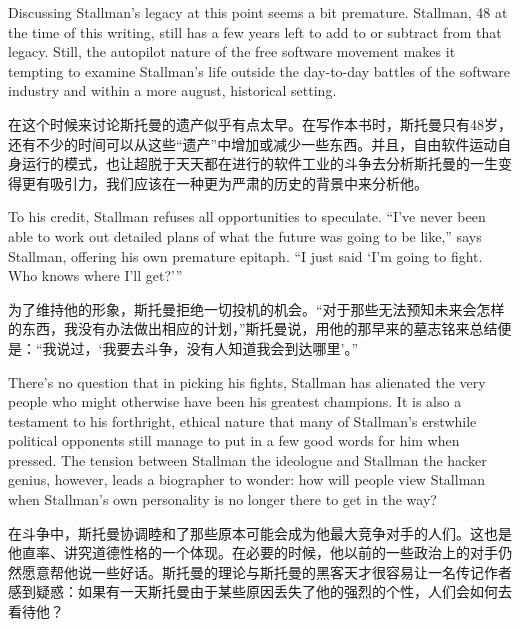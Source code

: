 \ifdefined\eng
Discussing Stallman's legacy at this point seems a bit premature. Stallman, 48 at the time of this writing, still has a few years left to add to or subtract from that legacy. Still, the autopilot nature of the free software movement makes it tempting to examine Stallman's life outside the day-to-day battles of the software industry and within a more august, historical setting.
\fi

\ifdefined\chs
在这个时候来讨论斯托曼的遗产似乎有点太早。在写作本书时，斯托曼只有48岁，还有不少的时间可以从这些``遗产''中增加或减少一些东西。并且，自由软件运动自身运行的模式，也让超脱于天天都在进行的软件工业的斗争去分析斯托曼的一生变得更有吸引力，我们应该在一种更为严肃的历史的背景中来分析他。
\fi

\ifdefined\eng
To his credit, Stallman refuses all opportunities to speculate. ``I've never been able to work out detailed plans of what the future was going to be like,'' says Stallman, offering his own premature epitaph. ``I just said `I'm going to fight. Who knows where I'll get?'\hspace{0.01in}''
\fi

\ifdefined\chs
为了维持他的形象，斯托曼拒绝一切投机的机会。``对于那些无法预知未来会怎样的东西，我没有办法做出相应的计划，''斯托曼说，用他的那早来的墓志铭来总结便是：``我说过，`我要去斗争，没有人知道我会到达哪里'。''
\fi

\ifdefined\eng
There's no question that in picking his fights, Stallman has alienated the very people who might otherwise have been his greatest champions. It is also a testament to his forthright, ethical nature that many of Stallman's erstwhile political opponents still manage to put in a few good words for him when pressed. The tension between Stallman the ideologue and Stallman the hacker genius, however, leads a biographer to wonder: how will people view Stallman when Stallman's own personality is no longer there to get in the way?
\fi

\ifdefined\chs
在斗争中，斯托曼协调睦和了那些原本可能会成为他最大竞争对手的人们。这也是他直率、讲究道德性格的一个体现。在必要的时候，他以前的一些政治上的对手仍然愿意帮他说一些好话。斯托曼的理论与斯托曼的黑客天才很容易让一名传记作者感到疑惑：如果有一天斯托曼由于某些原因丢失了他的强烈的个性，人们会如何去看待他？
\fi


